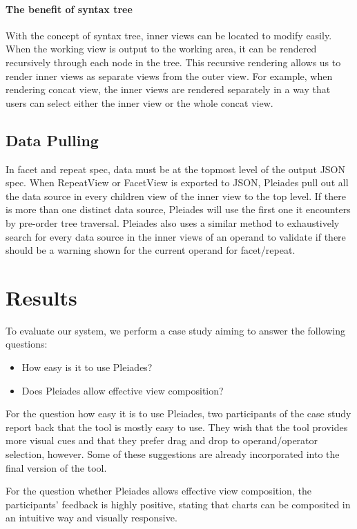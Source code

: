 \documentclass[journal]{vgtc}                %
\begin{document}
\paragraph{The benefit of syntax tree} With the concept of syntax tree, inner views
can be located to modify easily. When the working view is output to
the working area, it can be rendered recursively through each node in the tree.
This recursive rendering allows us to render inner views as separate views from
the outer view. For example, when rendering concat view, the inner views are
rendered separately in a way that users can select either the inner view or
the whole concat view.

\subsection{Data Pulling}
In facet and repeat spec, data must be at the topmost level of the output JSON
spec. When RepeatView or FacetView is exported to JSON, Pleiades pull out all
the data source in every children view of the inner view to the top level. If
there is more than one distinct data source, Pleiades will use the first one it
encounters by pre-order tree traversal. Pleiades also uses a similar method to
exhaustively search for every data source in the inner views of an operand to
validate if there should be a warning shown for the current operand for facet/repeat.

\section{Results}

To evaluate our system, we perform a case study aiming to answer the following
questions:

\begin{itemize}
\item How easy is it to use Pleiades?
\item Does Pleiades allow effective view composition?
\end{itemize}

For the question how easy it is to use Pleiades, two participants of the case
study report back that the tool is mostly easy to use. They wish that
the tool provides more visual cues and that they prefer drag and drop to
operand/operator selection, however. Some of these suggestions are already
incorporated into the final version of the tool.

For the question whether Pleiades allows effective view composition,
the participants' feedback is highly positive, stating that charts
can be composited in an intuitive way and visually responsive.
\end{document}
